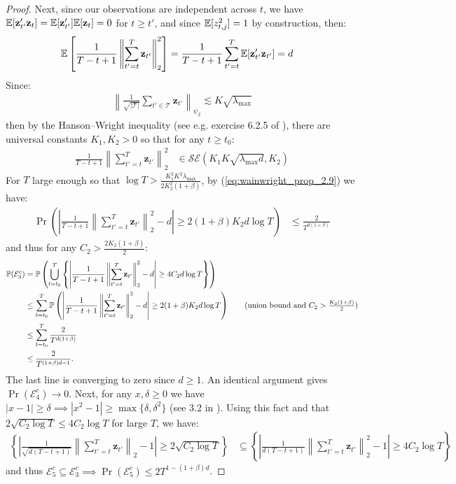 \begin{proof}
Next, since our observations are independent across $t$, we have $\mathbb{E}[\mathbf{z}'_{t'}\mathbf{z}_{t}] = \mathbb{E}[\mathbf{z}'_{t'}]\mathbb{E}[\mathbf{z}_{t}] = 0$ for $t \geq t'$, and since $\mathbb{E}[z_{t,j}^2] = 1$ by construction, then:
\begin{align*}
    \mathbb{E}\left[ \frac{1}{T-t+1}\left\lVert\sum_{t'=t}^T\mathbf{z}_{t'}\right\rVert_2^2\right] &=  \frac{1}{T-t+1}\sum_{t'=t}^T\mathbb{E}[\mathbf{z}'_{t'}\mathbf{z}_{t'}] = d
\end{align*}
Since:
\begin{align*}
    \left\lVert\frac{1}{\sqrt{|\mathcal{T}|}}\sum_{t'\in\mathcal{T}}\mathbf{z}_{t'}\right\rVert_{\psi_2} \lesssim K\sqrt{\lambda_{\max}}
\end{align*}
then by the Hanson–Wright inequality (see e.g. exercise 6.2.5 of \citealp{Vershynin18}), there are universal constants $K_1,K_2>0$ so that for any $t \geq t_0$:
\begin{align*}
    \frac{1}{T-t+1}\left\lVert\sum_{t'=t}^T\mathbf{z}_{t'}\right\rVert_2^2 &\in \mathcal{SE}(K_1K\sqrt{\lambda_{\max}d},K_2) 
\end{align*}
For $T$ large enough so that $\log T > \frac{K_1^2K^2\lambda_{\max}}{2K^2_2(1+\beta)}$, by (\ref{eq:wainwright_prop_2.9}) we have: 
\begin{align*}
    \Pr\left(\left| \frac{1}{T-t+1}\left\lVert\sum_{t'=t}^T\mathbf{z}_{t'}\right\rVert_2^2 - d\right| \geq 2(1+\beta)K_2d\log T\right) &\leq \frac{2}{T^{d(1+\beta)}}
\end{align*}
and thus for any $C_2 > \frac{2K_2(1+\beta)}{2}$:
\begin{align*}
    \Pr(\mathcal{E}^c_3) &= \Pr\left(\bigcup_{t= t_0}^T \left\{\left| \frac{1}{T-t+1}\left\lVert\sum_{t'=t}^T\mathbf{z}_{t'}\right\rVert_2^2 - d\right| \geq 4 C_2 d\log T \right\} \right) \\
    &\leq \sum_{t = t_0}^{T} \Pr\left(\left| \frac{1}{T-t+1}\left\lVert\sum_{t'=t}^T\mathbf{z}_{t'}\right\rVert_2^2 - d\right| \geq  2(1+\beta) K_2 d \log T \right) \tag{union bound and $C_2 > \frac{K_2(1+\beta)}{2}$} \\
    &\leq \sum_{t = t_0}^{T} \frac{2}{T^{d(1+\beta)}} \\
    &\leq \frac{2}{T^{(1+\beta)d - 1}}.
\end{align*}
The last line is converging to zero since $d \geq 1$. An identical argument gives $\Pr(\mathcal{E}^c_4) \to 0$. Next, for any $x,\delta \geq 0$ we have $|x - 1| \geq \delta \implies |x^2 - 1| \geq \max\{\delta, \delta^2\}$ (see 3.2 in \citealp{Vershynin18}). Using this fact and that $2\sqrt{C_2 \log T} \leq 4C_2 \log T$ for large $T$, we have:
\begin{align*}
    \left\{\left|\frac{1}{\sqrt{d(T-t+1)}}\left\lVert\sum_{t'=t}^T \mathbf{z}_{t'}\right\rVert_2 -1 \right| \geq  2\sqrt{ C_2 \log T}\right\} &\subseteq \left\{\left|\frac{1}{d(T-t+1)}\left\lVert\sum_{t'=t}^T \mathbf{z}_{t'}\right\rVert^2_2 -1 \right| \geq 4 C_2 \log T \right\} 
\end{align*}
and thus $\mathcal{E}_5^c \subseteq \mathcal{E}_3^c \implies \Pr(\mathcal{E}_5^c) \leq 2T^{1-(1+\beta)d}$.
\end{proof}
